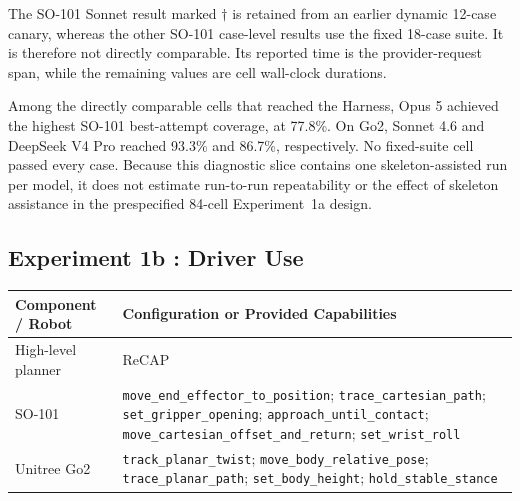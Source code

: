 The SO-101 Sonnet result marked $\dagger$ is retained from an earlier dynamic
12-case canary, whereas the other SO-101 case-level results use the fixed
18-case suite. It is therefore not directly comparable. Its reported time is
the provider-request span, while the remaining values are cell wall-clock
durations.

Among the directly comparable cells that reached the Harness, Opus 5 achieved
the highest SO-101 best-attempt coverage, at 77.8\%. On Go2, Sonnet 4.6 and
DeepSeek V4 Pro reached 93.3\% and 86.7\%, respectively. No fixed-suite cell
passed every case. Because this diagnostic slice contains one
skeleton-assisted run per model, it does not estimate run-to-run repeatability
or the effect of skeleton assistance in the prespecified 84-cell
Experiment~1a design.

\subsection[Experiment 1b: Driver Use]{Experiment 1b : Driver Use}

\begin{table}[htbp]
  \centering
  \begingroup
  \small
  \renewcommand{\arraystretch}{1.12}
  \begin{tabularx}{\textwidth}{@{}>{\raggedright\arraybackslash}p{39mm}X@{}}
    \toprule
    \textbf{Component / Robot} & \textbf{Configuration or Provided Capabilities} \\
    \midrule
    High-level planner & ReCAP \citep{zhang2025recap} \\
    SO-101 & \texttt{move\_end\_effector\_to\_position};
      \texttt{trace\_cartesian\_path}; \texttt{set\_gripper\_opening};
      \texttt{approach\_until\_contact};
      \texttt{move\_cartesian\_offset\_and\_return}; \texttt{set\_wrist\_roll} \\
    Unitree Go2 & \texttt{track\_planar\_twist};
      \texttt{move\_body\_relative\_pose}; \texttt{trace\_planar\_path};
      \texttt{set\_body\_height}; \texttt{hold\_stable\_stance} \\
    \bottomrule
  \end{tabularx}
  \endgroup
\end{table}

